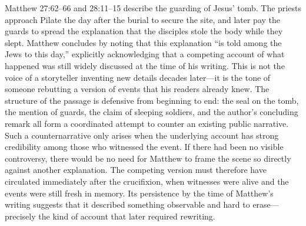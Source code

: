 Matthew 27:62--66 and 28:11--15 describe the guarding of Jesus' tomb.
The priests approach Pilate the day after the burial to secure the site, and later pay the guards to spread the explanation that the disciples stole the body while they slept.
Matthew concludes by noting that this explanation ``is told among the Jews to this day,'' explicitly acknowledging that a competing account of what happened was still widely discussed at the time of his writing.
This is not the voice of a storyteller inventing new details decades later---it is the tone of someone rebutting a version of events that his readers already knew.
The structure of the passage is defensive from beginning to end: the seal on the tomb, the mention of guards, the claim of sleeping soldiers, and the author's concluding remark all form a coordinated attempt to counter an existing public narrative.
Such a counternarrative only arises when the underlying account has strong credibility among those who witnessed the event.
If there had been no visible controversy, there would be no need for Matthew to frame the scene so directly against another explanation.
The competing version must therefore have circulated immediately after the crucifixion, when witnesses were alive and the events were still fresh in memory.
Its persistence by the time of Matthew's writing suggests that it described something observable and hard to erase---precisely the kind of account that later required rewriting.

